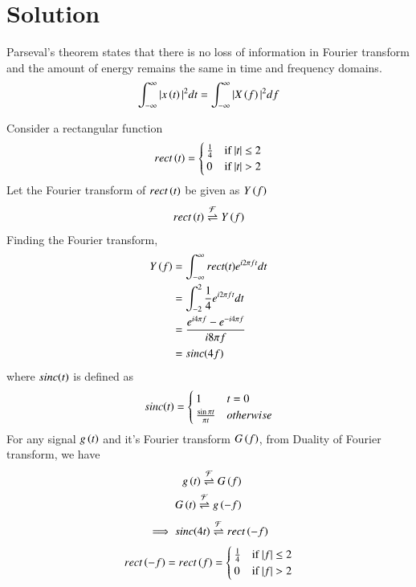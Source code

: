 \documentclass[journal,12pt,twocolumn]{IEEEtran}
\begin{document}
\section{Solution}
\begin{lemma}
Parseval's theorem states that there is no loss of information in Fourier transform and the amount of energy remains the same in time and frequency domains.
\begin{align}
    \int_{-\infty}^{\infty} |x\left(t\right)|^{2} dt = \int_{-\infty}^{\infty} |X\left(f\right)|^{2} df
\end{align}
\end{lemma}
Consider a rectangular function
\begin{align}
rect\left(t\right) =
    \begin{cases}
    \frac{1}{4} & \text{if } |t| \leq 2\\
    0 & \text{if } |t| > 2
    \end{cases}
\end{align}
Let the Fourier transform of $rect\left(t\right)$ be given as $Y\left(f\right)$
\begin{align}
    rect\left(t\right) \overset{\mathcal{F}}{ \rightleftharpoons}{Y} \left(f\right)
\end{align}
Finding the Fourier transform,
\begin{align}
    Y\left(f\right) &= \int_{-\infty}^{\infty} rect(t)e^{i2\pi ft}dt\\
    &= \int_{-2}^{2}\frac{1}{4}e^{i2\pi ft}dt\\
    &= \frac{e^{i4\pi f} - e^{-i4\pi f}}{i8\pi f}\\
    &= sinc{\left(4f\right)}
\end{align}
where $sinc{\left(t\right)}$ is defined as
\begin{align}
sinc{\left(t\right)} =
    \begin{cases}
    1 & t = 0\\
    \frac{\sin{\pi t}}{\pi t} & otherwise
    \end{cases}
\end{align}
For any signal $g\left(t\right)$ and it's Fourier transform $G\left(f\right)$, from Duality of Fourier transform, we have
\begin{align}
    g\left(t\right) \overset{\mathcal{F}}{ \rightleftharpoons}{G} \left(f\right)\\
    G\left(t\right) \overset{\mathcal{F}}{ \rightleftharpoons}{g} \left(-f\right)
\end{align}
\begin{align}
    \implies sinc{\left(4t\right)} \overset{\mathcal{F}}{ \rightleftharpoons} rect\left(-f\right) 
\end{align}
\begin{align}
    rect\left(-f\right) = rect\left(f\right) = 
    \begin{cases}
    \frac{1}{4} & \text{if } |f| \leq 2\\
    0 & \text{if } |f| > 2
    \end{cases}
\end{align}
\end{document}
